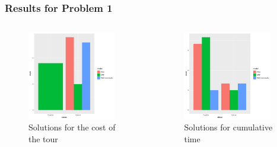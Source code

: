 \documentclass[aspectratio=169]{beamer}
\newcommand{\nologo}{\setbeamertemplate{logo}{}}
\begin{document}
{\nologo
\begin{frame}
\frametitle{Results for Problem 1}
\begin{columns}
\begin{figure}[ht]
\centering
\includegraphics[width=0.9\textwidth]{images/figure:1a.pdf}
\caption{Solutions for the cost of the tour}
\end{figure}
 

\begin{figure}[ht]
\centering
\includegraphics[width=0.9\textwidth]{images/figure:1b.pdf}
\caption{Solutions for cumulative time}
\end{figure}
\end{columns}
\end{frame}


}
\end{document}

